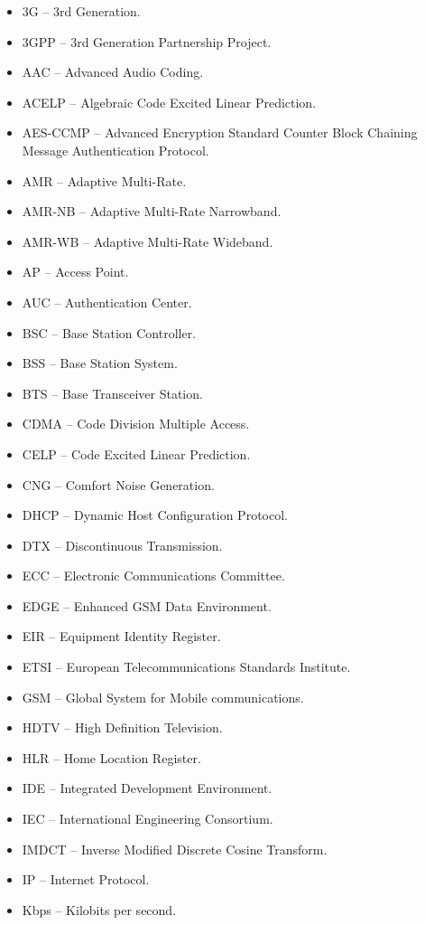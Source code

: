 \documentclass[12pt,svgnames,smaller]{article} %
\begin{document}
	\begin{itemize}
		\item 3G – 3rd Generation.
		\item 3GPP – 3rd Generation Partnership Project.
		\item AAC – Advanced Audio Coding.
		\item ACELP – Algebraic Code Excited Linear Prediction. 
		\item AES-CCMP – Advanced Encryption Standard Counter Block Chaining Message Authentication Protocol.
		\item AMR – Adaptive Multi-Rate.
		\item AMR-NB – Adaptive Multi-Rate Narrowband. 
		\item AMR-WB – Adaptive Multi-Rate Wideband.
		\item AP – Access Point.
		\item AUC – Authentication Center.
		\item BSC – Base Station Controller. 
		\item BSS – Base Station System.
		\item BTS – Base Transceiver Station.
		\item CDMA – Code Division Multiple Access. 
		\item CELP – Code Excited Linear Prediction.
		\item CNG – Comfort Noise Generation.
		\item DHCP – Dynamic Host Configuration Protocol.
		\item DTX – Discontinuous Transmission.
		\item ECC – Electronic Communications Committee.
		\item EDGE – Enhanced GSM Data Environment.
		\item EIR – Equipment Identity Register.
		\item ETSI – European Telecommunications Standards Institute.
		\item GSM – Global System for Mobile communications.
		\item HDTV – High Definition Television.
		\item HLR – Home Location Register.
		\item IDE – Integrated Development Environment.
		\item IEC – International Engineering Consortium.
		\item IMDCT – Inverse Modified Discrete Cosine Transform.
		\item IP – Internet Protocol.
		\item Kbps – Kilobits per second.

\end{itemize}
\end{document}
